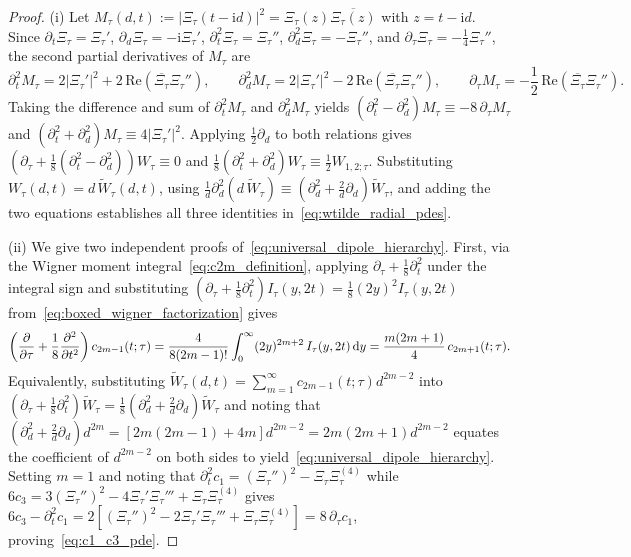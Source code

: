 \documentclass[11pt,reqno]{amsart}
\theoremstyle{definition}
\theoremstyle{remark}
\numberwithin{equation}{section}
\newcommand{\dd}{\mathrm{d}}
\newcommand{\ii}{\mathrm{i}}
\newcommand{\Rea}{\mathrm{Re}}
\newcommand{\fac}{\mathclose{\mathchar"0021}}
\begin{document}
\begin{proof}
(i) Let $M_\tau(d,t) := |\Xi_\tau(t-\ii d)|^2 = \Xi_\tau(z)\overline{\Xi_\tau(z)}$ with $z = t - \ii d$. Since $\partial_t\Xi_\tau = \Xi_\tau'$, $\partial_d\Xi_\tau = -\ii\Xi_\tau'$, $\partial_t^2\Xi_\tau = \Xi_\tau''$, $\partial_d^2\Xi_\tau = -\Xi_\tau''$, and $\partial_\tau\Xi_\tau = -\frac{1}{4}\Xi_\tau''$, the second partial derivatives of $M_\tau$ are
\[
\partial_t^2 M_\tau = 2|\Xi_\tau'|^2 + 2\,\Rea(\overline{\Xi_\tau}\Xi_\tau''), \qquad \partial_d^2 M_\tau = 2|\Xi_\tau'|^2 - 2\,\Rea(\overline{\Xi_\tau}\Xi_\tau''), \qquad \partial_\tau M_\tau = -\frac{1}{2}\,\Rea(\overline{\Xi_\tau}\Xi_\tau'').
\]
Taking the difference and sum of $\partial_t^2 M_\tau$ and $\partial_d^2 M_\tau$ yields $(\partial_t^2 - \partial_d^2)M_\tau \equiv -8\,\partial_\tau M_\tau$ and $(\partial_t^2 + \partial_d^2)M_\tau \equiv 4|\Xi_\tau'|^2$. Applying $\frac{1}{2}\partial_d$ to both relations gives $(\partial_\tau + \frac{1}{8}(\partial_t^2 - \partial_d^2))W_\tau \equiv 0$ and $\frac{1}{8}(\partial_t^2 + \partial_d^2)W_\tau \equiv \frac{1}{2}W_{1,2;\tau}$. Substituting $W_\tau(d,t) = d\,\widetilde{W}_\tau(d,t)$, using $\frac{1}{d}\partial_d^2(d\,\widetilde{W}_\tau) \equiv (\partial_d^2 + \frac{2}{d}\partial_d)\widetilde{W}_\tau$, and adding the two equations establishes all three identities in~\eqref{eq:wtilde_radial_pdes}.

(ii) We give two independent proofs of~\eqref{eq:universal_dipole_hierarchy}. First, via the Wigner moment integral~\eqref{eq:c2m_definition}, applying $\partial_\tau + \frac{1}{8}\partial_t^2$ under the integral sign and substituting $(\partial_\tau + \frac{1}{8}\partial_t^2)I_\tau(y,2t) = \frac{1}{8}(2y)^2 I_\tau(y,2t)$ from~\eqref{eq:boxed_wigner_factorization} gives
\[
\left(\frac{\partial}{\partial\tau} + \frac{1}{8}\frac{\partial^2}{\partial t^2}\right)c_{2m-1}(t;\tau) = \frac{4}{8(2m-1)\fac}\int_0^{\infty} (2y)^{2m+2}\,I_\tau(y,2t)\,\dd y = \frac{m(2m+1)}{4}\,c_{2m+1}(t;\tau).
\]
Equivalently, substituting $\widetilde{W}_\tau(d,t) = \sum_{m=1}^\infty c_{2m-1}(t;\tau)d^{2m-2}$ into $(\partial_\tau + \frac{1}{8}\partial_t^2)\widetilde{W}_\tau = \frac{1}{8}(\partial_d^2 + \frac{2}{d}\partial_d)\widetilde{W}_\tau$ and noting that $(\partial_d^2 + \frac{2}{d}\partial_d)d^{2m} = [2m(2m-1) + 4m]d^{2m-2} = 2m(2m+1)d^{2m-2}$ equates the coefficient of $d^{2m-2}$ on both sides to yield~\eqref{eq:universal_dipole_hierarchy}. Setting $m = 1$ and noting that $\partial_t^2 c_1 = (\Xi_\tau'')^2 - \Xi_\tau\Xi_\tau^{(4)}$ while $6c_3 = 3(\Xi_\tau'')^2 - 4\Xi_\tau'\Xi_\tau''' + \Xi_\tau\Xi_\tau^{(4)}$ gives $6c_3 - \partial_t^2 c_1 = 2[(\Xi_\tau'')^2 - 2\Xi_\tau'\Xi_\tau''' + \Xi_\tau\Xi_\tau^{(4)}] = 8\,\partial_\tau c_1$, proving~\eqref{eq:c1_c3_pde}.
\end{proof}
\end{document}
